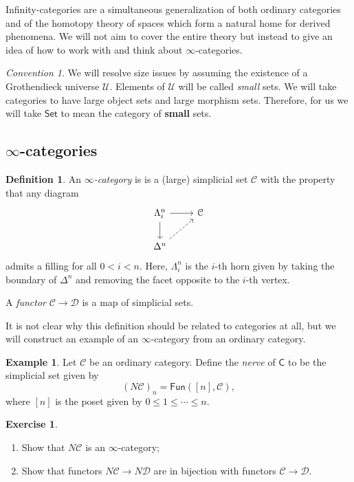 \documentclass[10pt]{amsart}
\theoremstyle{definition}
\newtheorem{defn}[thm]{Definition}
\newtheorem{exm}[thm]{Example}
\newtheorem{exer}[thm]{Exercise}
\theoremstyle{remark}
\newtheorem{conv}[thm]{Convention}
\theoremstyle{plain}
\theoremstyle{definition}
\theoremstyle{remark}
\newcommand{\mc}[1]{\mathcal{#1}}
\newcommand{\ms}[1]{\mathsf{#1}}
\newcommand{\1}{\mathbf{1}}
\newcommand{\2}{\mathbf{2}}
\newcommand{\3}{\mathbf{3}}
\begin{document}
Infinity-categories are a simultaneous generalization of both ordinary categories and of the homotopy theory of spaces which form a natural home for derived phenomena. We will not aim to cover the entire theory but instead to give an idea of how to work with and think about $\infty$-categories.

\begin{conv}
    We will resolve size issues by assuming the existence of a Grothendieck universe $\mc{U}$. Elements of $\mc{U}$ will be called \textit{small} sets. We will take categories to have large object sets and large morphism sets. Therefore, for us we will take $\ms{Set}$ to mean the category of \textbf{small} sets.
\end{conv}

\subsection{$\infty$-categories}%
\label{sub:infinity cats}

\begin{defn}
    An \textit{$\infty$-category} is is a (large) simplicial set $\mc{C}$ with the property that any diagram
    \begin{equation*}
    \begin{tikzcd}
        \Lambda_i^n \ar{r} \ar{d} & \mc{C} \\
        \Delta^n \ar[dashrightarrow]{ur}
    \end{tikzcd}
    \end{equation*}
    admits a filling for all $0 < i < n$. Here, $\Lambda_i^n$ is the $i$-th horn given by taking the boundary of $\Delta^n$ and removing the facet opposite to the $i$-th vertex.

    A \textit{functor} $\mc{C} \to \mc{D}$ is a map of simplicial sets.
\end{defn}

It is not clear why this definition should be related to categories at all, but we will construct an example of an $\infty$-category from an ordinary category.

\begin{exm}
    Let $\mc{C}$ be an ordinary category. Define the \textit{nerve} of $\ms{C}$ to be the simplicial set given by
    \[ (N \mc{C})_n = \ms{Fun}([n], \mc{C}), \]
    where $[n]$ is the poset given by $0 \leq 1 \leq \cdots \leq n$.
\end{exm}

\begin{exer}\leavevmode
    \begin{enumerate}
        \item Show that $N\mc{C}$ is an $\infty$-category;
        \item Show that functors $N\mc{C} \to N \mc{D}$ are in bijection with functors $\mc{C} \to \mc{D}$.
    \end{enumerate}
\end{exer}
\end{document}
